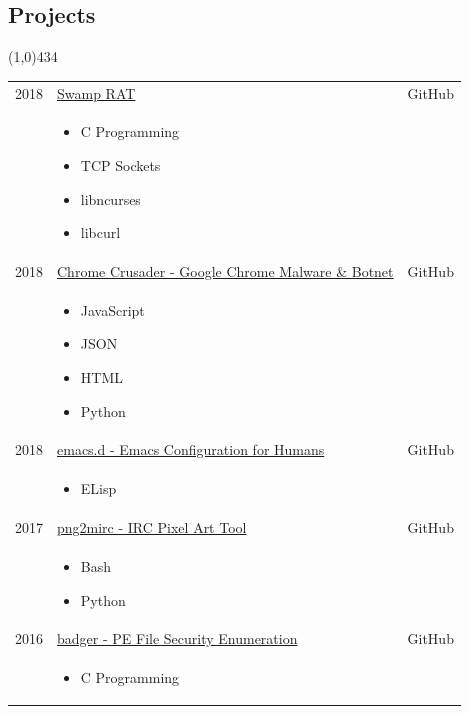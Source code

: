 \documentclass{res}
\newcommand{\frstCVcell}{2.5cm}
\begin{document}
\begin{resume}
  \pagebreak
  \section{Projects}
  \line(1,0){434}
  \newline
  \newline
  \begin{tabularx}{\textwidth}{p{\frstCVcell}Xc}
    2018 & \href{https://github.com/lillypad/swamp-rat}{Swamp RAT} & GitHub\\
    &
    \begin{itemize}
    \item C Programming
    \item TCP Sockets
    \item libncurses
    \item libcurl
    \end{itemize}
    & \\
    2018 & \href{https://github.com/lillypad/chrome-crusader}{Chrome Crusader - Google Chrome Malware \& Botnet} & GitHub\\
    &
    \begin{itemize}
    \item JavaScript
    \item JSON
    \item HTML
    \item Python
    \end{itemize}
    & \\
    2018 & \href{https://github.com/lillypad/emacs.d}{emacs.d - Emacs Configuration for Humans} & GitHub\\
    &
    \begin{itemize}
    \item ELisp
    \end{itemize}
    & \\
    2017 & \href{https://github.com/lillypad/png2mirc}{png2mirc - IRC Pixel Art Tool} & GitHub\\
    &
    \begin{itemize}
    \item Bash
    \item Python
    \end{itemize}
    & \\
    2016 & \href{https://github.com/lillypad/badger}{badger - PE File Security Enumeration} & GitHub\\
    &
    \begin{itemize}
    \item C Programming
    \end{itemize}

\end{tabularx}
\end{resume}
\end{document}
